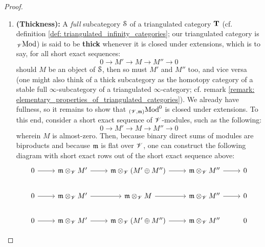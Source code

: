 \begin{proof}
\begin{enumerate}
                                \item \textbf{(Thickness):} A \textit{full} subcategory $\S$ of a triangulated category $\T$ (cf. definition \ref{def: triangulated_infinity_categories}; our triangulated category is ${}_{\scrV}\Mod$) is said to be \textbf{thick} whenever it is closed under extensions, which is to say, for all short exact sequences:
                                    $$0 \to M' \to M \to M'' \to 0$$
                                should $M$ be an object of $\S$, then so must $M'$ and $M''$ too, and vice versa (one might also think of a thick subcategory as the homotopy category of a stable full $\infty$-subcategory of a triangulated $\infty$-category; cf. remark \ref{remark: elementary_properties_of_triangulated_categories}). We already have fullness, so it remains to show that ${}_{(\scrV, \m)}\Mod^0$ is closed under extensions. To this end, consider a short exact sequence of $\scrV$-modules, such as the following:
                                    $$0 \to M' \to M \to M'' \to 0$$
                                wherein $M$ is almost-zero. Then, because binary direct sums of modules are biproducts and because $\m$ is flat over $\scrV$, one can construct the following diagram with short exact rows out of the short exact sequence above:
                                    $$
                                        \begin{tikzcd}
                                        	0 & {\m \tensor_{\scrV} M'} & {\m \tensor_{\scrV} (M' \oplus M'')} & {\m \tensor_{\scrV} M''} & 0 \\
                                        	0 & {\m \tensor_{\scrV} M'} & {\m \tensor_{\scrV} M} & {\m \tensor_{\scrV} M''} & 0 \\
                                        	0 & {\m \tensor_{\scrV} M'} & {\m \tensor_{\scrV} (M' \oplus M'')} & {\m \tensor_{\scrV} M''} & 0
                                        	\arrow[from=1-1, to=1-2]
                                        	\arrow[from=1-2, to=1-3]
                                        	\arrow[from=1-3, to=1-4]
                                        	\arrow[from=1-4, to=1-5]
                                        	\arrow[from=2-1, to=2-2]
                                        	\arrow[from=2-2, to=2-3]
                                        	\arrow[from=2-3, to=2-4]
                                        	\arrow[from=2-4, to=2-5]
                                        	\arrow[from=3-1, to=3-2]
                                        	\arrow[from=3-2, to=3-3]
                                        	\arrow[from=3-3, to=3-4]

\end{tikzcd}$$
\end{enumerate}
\end{proof}
